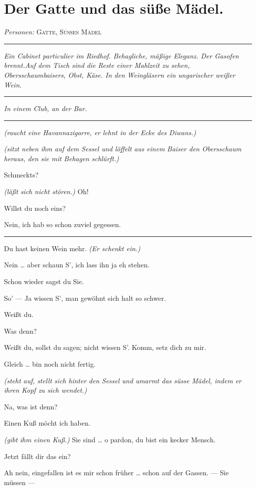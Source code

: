 \documentclass[
	final,
	a4paper,
	ngerman,
	mpinclude = true, %
	twoside = true,
	open = right,
	cleardoublepage = plain,
	DIV = 13,
	BCOR = 1cm,
	titlepage = firstiscover,
	]{scrbook}
\newcommand{\scene}{\section}
\newcommand{\direction}[1]{\textit{(#1)}}
\newcommand{\setting}[1]{\vspace{-0.5\baselineskip}\centering\textit{#1}}
\newenvironment{deletion}{%
		\vspace{0.25\baselineskip}
		\hrule
		\vspace{0.25\baselineskip}
		\color{darkgray}
	}{
		\color{black}
		\vspace{0.25\baselineskip}
		\hrule 
		\vspace{0.25\baselineskip}
	}
\newcommand{\characterlist}[1]{{\begin{center}\textit{Personen:} #1\end{center}}}
\newcommand{\thecharacter}[1]{\textup{\textsc{#1}}}
\newcommand{\thegatte}{\thecharacter{Gatte}}
\newcommand{\thesuesse}{\thecharacter{Süßes Mädel}}
\newcommand{\character}[1]{\item[#1:]}
\newcommand{\gatte}{\character{\thegatte}}
\newcommand{\suesse}{\character{\thesuesse}}
\begin{document}
\scene{Der Gatte und das süße Mädel.}
\characterlist{\thegatte, \thesuesse}
\begin{deletion}
\setting{Ein Cabinet particulier im Riedhof. Behagliche, mäßige Eleganz. Der Gasofen brennt.Auf dem Tisch sind die Reste einer Mahlzeit zu sehen, Obersschaumbaisers, Obst, Käse. In den Weingläsern ein ungarischer weißer Wein.}
\end{deletion}
\setting{In einem Club, an der Bar.}
\begin{play}
	\begin{deletion}
	\gatte
	\direction{raucht eine Havannazigarre, er lehnt in der Ecke des Diwans.}

	\suesse
	\direction{sitzt neben ihm auf dem Sessel und löffelt aus einem Baiser den Obersschaum heraus, den sie mit Behagen schlürft.}

	\gatte
	Schmeckts?

	\suesse
	\direction{läßt sich nicht stören.} Oh!

	\gatte
	Willst du noch eins?

	\suesse
	Nein, ich hab so schon zuviel gegessen.
	\end{deletion}

	\gatte
	Du hast keinen Wein mehr. \direction{Er schenkt ein.}

	\suesse
	Nein \ldots{} aber schaun S', ich lass ihn ja eh stehen.

	\gatte
	Schon wieder sagst du Sie.

	\suesse
	So' --- Ja wissen S', man gewöhnt sich halt so schwer.

	\gatte
	Weißt du.

	\suesse
	Was denn?

	\gatte
	Weißt du, sollst du sagen; nicht wissen S'. Komm, setz dich zu mir.

	\suesse
	Gleich \ldots{} bin noch nicht fertig.

	\gatte
	\direction{steht auf, stellt sich hinter den Sessel und umarmt das süsse Mädel, indem er ihren Kopf zu sich wendet.}

	\suesse
	Na, was ist denn?

	\gatte
	Einen Kuß möcht ich haben.

	\suesse
	\direction{gibt ihm einen Kuß.} Sie sind \ldots{} o pardon, du bist ein kecker Mensch.

	\gatte
	Jetzt fällt dir das ein?

	\suesse
	Ah nein, eingefallen ist es mir schon früher \ldots{} schon auf der Gassen. --- Sie müssen ---


\end{play}
\end{document}
